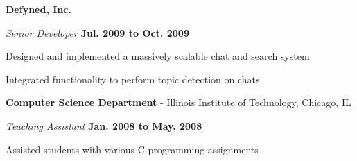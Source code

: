 \documentclass[10pt]{article}
\renewcommand{\section}[2]%
        {\pagebreak[2]\vspace{1.3\baselineskip}%
         \phantomsection\addcontentsline{toc}{section}{#1}%
         \hspace{0in}%
         \marginpar{
         \raggedright \scshape #1}#2}
\newenvironment{outerlist}[1][\enskip\textbullet]%
        {\begin{enumerate}[#1]}{\end{enumerate}%
         \vspace{-.6\baselineskip}}
\newenvironment{innerlist}[1][\enskip\textbullet]%
        {\begin{compactenum}[#1]}{\end{compactenum}}
\newcommand{\blankline}{\quad\pagebreak[2]}
\begin{document}
\blankline

\textbf{Defyned, Inc.}
\begin{outerlist}
	\item[] \textit{Senior Developer} \hfill \textbf{Jul. 2009 to Oct. 2009}
	\begin{innerlist}
		\item Designed and implemented a massively scalable chat and search system
        \item Integrated functionality to perform topic detection on chats
	\end{innerlist}
\end{outerlist}

\blankline

\textbf{Computer Science Department} - Illinois Institute of Technology, Chicago, IL
\begin{outerlist}
	\item[] \textit{Teaching Assistant} \hfill \textbf{Jan. 2008 to May. 2008}
	\begin{innerlist}
        \item Assisted students with various C programming assignments
	\end{innerlist}
\end{outerlist}


\end{document}
